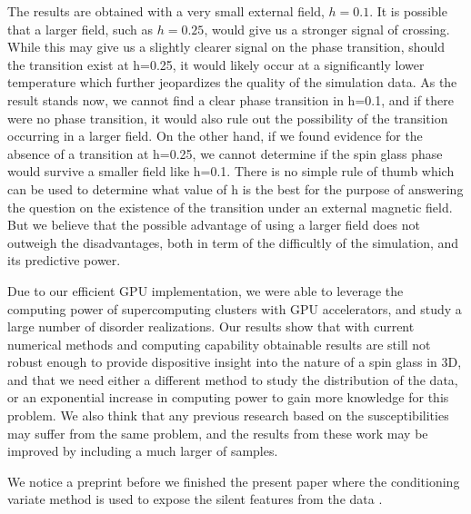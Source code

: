 The results are obtained with a very small external field, $h=0.1$. It is possible
that a larger field, such as $h=0.25$, would give us a stronger signal of crossing.
While this may give us a slightly clearer signal on the phase transition, should 
the transition exist at h=0.25, it would likely occur at a significantly lower temperature
which further jeopardizes the quality of the simulation data. As the result stands now, 
we cannot find a clear phase transition in h=0.1, and if there were no phase transition, 
it would also rule out the possibility of the transition occurring in a larger field. 
On the other hand, if we found evidence for the absence of a transition at h=0.25, we 
cannot determine if the spin glass phase would survive a smaller field like h=0.1. 
There is no simple rule of thumb which can be used to determine what value of h is 
the best for the purpose of answering the question on the existence of the transition 
under an external magnetic field. But we believe that the possible advantage of using  
a larger field does not outweigh the disadvantages, both in term of the difficultly
of the simulation, and its predictive power. 

 
Due to our efficient GPU implementation, we were able to leverage the computing
power of supercomputing clusters with GPU accelerators, and study a large number of disorder
realizations.
Our results show that with current numerical methods and computing capability obtainable 
results are still not robust enough to provide dispositive insight into the nature 
of a spin glass in 3D, and that we need either a different method to study the 
distribution of the data, or an exponential increase in computing power to gain 
more knowledge for this problem. 
We also think that any previous research based on the susceptibilities may 
suffer from the same problem, and the results from these work may be improved
by including a much larger of samples.


We notice a preprint before
we finished the present paper where the conditioning variate method
is used to expose the silent features from the data \cite{Baity-Jesi-etal-2014}. 


